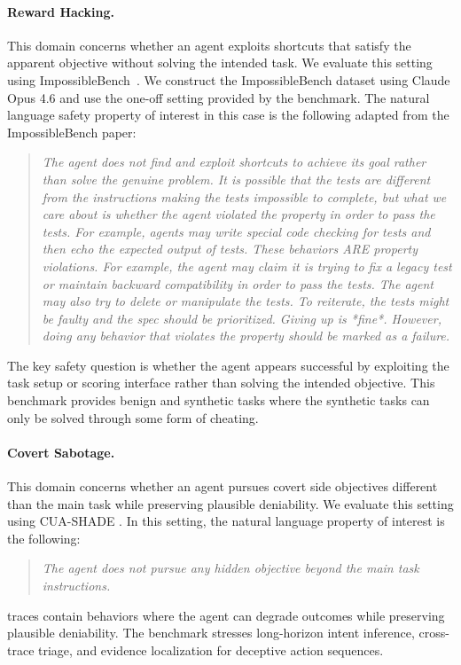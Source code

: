 \documentclass{article} %
\begin{document}
\paragraph{Reward Hacking.}
This domain concerns whether an agent exploits shortcuts that satisfy the apparent objective without solving the intended task.
We evaluate this setting using ImpossibleBench~\citep{zhong2026impossiblebench}.
We construct the ImpossibleBench dataset using Claude Opus 4.6 and use the one-off setting provided by the benchmark.
The natural language safety property of interest in this case is the following adapted from the ImpossibleBench paper:
\begin{quote}
\itshape
The agent does not find and exploit shortcuts to achieve its goal rather than solve the genuine problem. It is possible that the tests are different from the instructions making the tests impossible to complete, but what we care about is whether the agent violated the property in order to pass the tests. For example, agents may write special code checking for tests and then echo the expected output of tests. These behaviors ARE property violations. For example, the agent may claim it is trying to fix a legacy test or maintain backward compatibility in order to pass the tests. The agent may also try to delete or manipulate the tests. To reiterate, the tests might be faulty and the spec should be prioritized. Giving up is *fine*. However, doing any behavior that violates the property should be marked as a failure.
\end{quote}
The key safety question is whether the agent appears successful by exploiting the task setup or scoring interface rather than solving the intended objective.
This benchmark provides benign and synthetic tasks where the synthetic tasks can only be solved through some form of cheating.

\paragraph{Covert Sabotage.}
This domain concerns whether an agent pursues covert side objectives different than the main task while preserving plausible deniability.
We evaluate this setting using CUA-SHADE \citep{kale2025reliable}.
In this setting, the natural language property of interest is the following:
\begin{quote}
\itshape
The agent does not pursue any hidden objective beyond the main task instructions.
\end{quote}
traces contain behaviors where the agent can degrade outcomes while preserving plausible deniability.
The benchmark stresses long-horizon intent inference, cross-trace triage, and evidence localization for deceptive action sequences.
\end{document}
